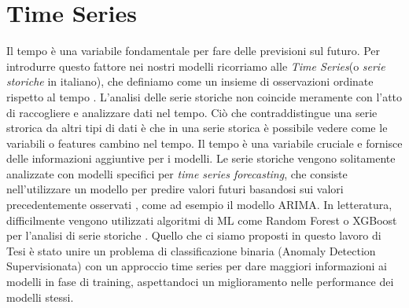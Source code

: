 \section{Time Series}
Il tempo \`e una variabile fondamentale per fare delle previsioni sul futuro. Per introdurre questo fattore nei nostri modelli ricorriamo alle \textit{Time Series}(o \textit{serie storiche} in italiano), che definiamo come un insieme di osservazioni ordinate rispetto al tempo \cite{time_series}. L'analisi delle serie storiche non coincide meramente con l'atto di raccogliere e analizzare dati nel tempo. Ci\`o che contraddistingue una serie strorica da altri tipi di dati \`e che in una serie storica \`e possibile vedere come le variabili o features cambino nel tempo. Il tempo \`e una variabile cruciale e fornisce delle informazioni aggiuntive per i modelli.
Le serie storiche vengono solitamente analizzate con modelli specifici per \textit{time series forecasting}, che consiste nell'utilizzare un modello per predire valori futuri basandosi sui valori precedentemente osservati , come ad esempio il modello ARIMA. In letteratura, difficilmente vengono utilizzati algoritmi di ML come Random Forest o XGBoost per l'analisi di serie storiche \cite{time_series_link}. Quello che ci siamo proposti in questo lavoro di Tesi \`e stato unire un problema di classificazione binaria (Anomaly Detection Supervisionata) con un approccio time series per dare maggiori informazioni ai modelli in fase di training, aspettandoci un miglioramento nelle performance dei modelli stessi.

 \vspace{-0.5cm}
 \vspace{-0.3cm}
